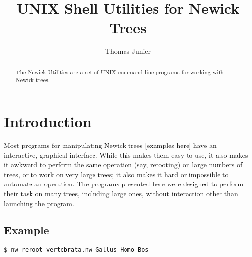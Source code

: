 \documentclass[a4paper,10pt]{article}
\title{UNIX Shell Utilities for Newick Trees}
\author{Thomas Junier}
\begin{document}
\maketitle

\begin{abstract}
The Newick Utilities are a set of UNIX command-line programs for working with Newick trees.
\end{abstract}

\section{Introduction}

Most programs for manipulating Newick trees [examples here] have an interactive, graphical interface. While this makes them easy to use, it also makes it awkward to perform the same operation (say, rerooting) on large numbers of trees, or to work on very large trees; it also makes it hard or impossible to automate an operation. The programs presented here were designed to perform their task on many trees, including large ones, without interaction other than launching the program.

\subsection*{Example}

\verb|$ nw_reroot vertebrata.nw Gallus Homo Bos|
\end{document}
